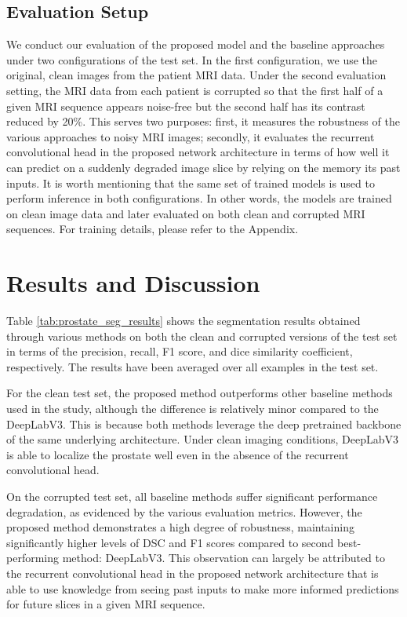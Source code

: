 \documentclass[journal]{IEEEtran}
\begin{document}
\subsection{Evaluation Setup}
We conduct our evaluation of the proposed model and the baseline approaches under two configurations of the test set. In the first configuration, we use the original, clean images from the patient MRI data. Under the second evaluation setting, the MRI data from each patient is corrupted so that the first half of a given MRI sequence appears noise-free but the second half has its contrast reduced by 20\%. This serves two purposes: first, it measures the robustness of the various approaches to noisy MRI images; secondly, it evaluates the recurrent convolutional head in the proposed network architecture in terms of how well it can predict on a suddenly degraded image slice by relying on the memory its past inputs. It is worth mentioning that the same set of trained models is used to perform inference in both configurations. In other words, the models are trained on clean image data and later evaluated on both clean and corrupted MRI sequences. For training details, please refer to the Appendix. 

\section{Results and Discussion}
Table \ref{tab:prostate_seg_results} shows the segmentation results obtained through various methods on both the clean and corrupted versions of the test set in terms of the precision, recall, F1 score, and dice similarity coefficient, respectively. The results have been averaged over all examples in the test set. 

For the clean test set, the proposed method outperforms other baseline methods used in the study, although the difference is relatively minor compared to the DeepLabV3. This is because both methods leverage the deep pretrained backbone of the same underlying architecture. Under clean imaging conditions, DeepLabV3 is able to localize the prostate well even in the absence of the recurrent convolutional head. 

On the corrupted test set, all baseline methods suffer significant performance degradation, as evidenced by the various evaluation metrics. However, the proposed method demonstrates a high degree of robustness, maintaining significantly higher levels of DSC and F1 scores compared to second best-performing method: DeepLabV3. This observation can largely be attributed to the recurrent convolutional head in the proposed network architecture that is able to use knowledge from seeing past inputs to make more informed predictions for future slices in a given MRI sequence. 
\end{document}
